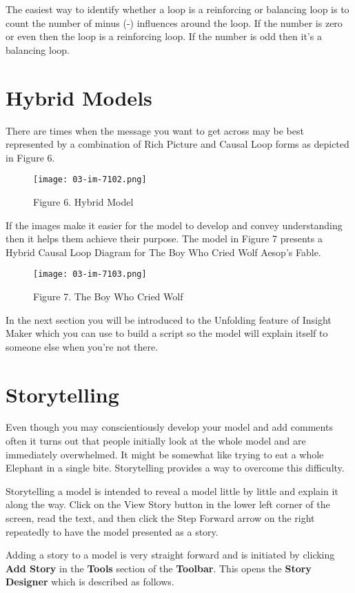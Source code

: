 \documentclass[]{memoir}
\makeatletter
\def\maxwidth{\ifdim\Gin@nat@width>\linewidth\linewidth
\else\Gin@nat@width\fi}
\let\Oldincludegraphics\includegraphics
\renewcommand{\includegraphics}[1]{\Oldincludegraphics[width=\maxwidth]{#1}}
\renewcommand{\u}[1]{\textbf{#1}}
\makeatother
\begin{document}
The easiest way to identify whether a loop is a reinforcing or balancing
loop is to count the number of minus (-) influences around the loop. If
the number is zero or even then the loop is a reinforcing loop. If the
number is odd then it's a balancing loop.

\section{Hybrid Models}

There are times when the message you want to get across may be best
represented by a combination of Rich Picture and Causal Loop forms as
depicted in Figure 6.

\begin{figure}[htbp]
\centering
\texttt{[image: 03-im-7102.png]}
\caption{Figure 6. Hybrid Model}
\end{figure}

If the images make it easier for the model to develop and convey
understanding then it helps them achieve their purpose. The model in
Figure 7 presents a Hybrid Causal Loop Diagram for The Boy Who Cried
Wolf Aesop's Fable.

\begin{figure}[htbp]
\centering
\texttt{[image: 03-im-7103.png]}
\caption{Figure 7. The Boy Who Cried Wolf}
\end{figure}

In the next section you will be introduced to the Unfolding feature of
Insight Maker which you can use to build a script so the model will
explain itself to someone else when you're not there.

\section{Storytelling}

Even though you may conscientiously develop your model and add comments
often it turns out that people initially look at the whole model and are
immediately overwhelmed. It might be somewhat like trying to eat a whole
Elephant in a single bite. Storytelling provides a way to overcome this
difficulty.

Storytelling a model is intended to reveal a model little by little and
explain it along the way. Click on the View Story button in the lower
left corner of the screen, read the text, and then click the Step
Forward arrow on the right repeatedly to have the model presented as a
story.

Adding a story to a model is very straight forward and is initiated by
clicking \u{Add Story} in the \u{Tools} section of the \u{Toolbar}. This
opens the \u{Story Designer} which is described as follows.
\end{document}
